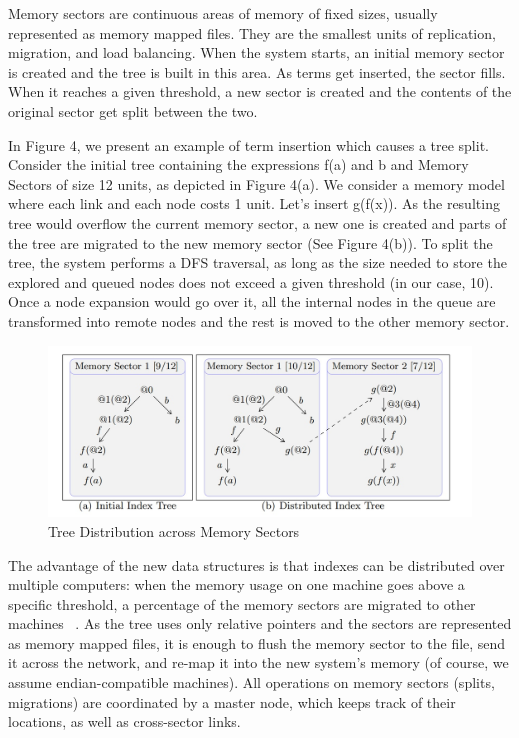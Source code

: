 \documentclass{deliverablereport}
\begin{document}
Memory sectors are continuous areas of memory of fixed sizes, usually represented as memory mapped files. They are the smallest units of replication, migration, and load balancing. When the system starts, an initial memory sector is created and the tree is built in this area. As terms get inserted, the sector fills. When it reaches a given threshold, a new sector is created and the contents of the original sector get split between the two. 

In Figure 4, we present an example of term insertion which causes a tree split. Consider the initial tree containing the expressions f(a) and b and Memory Sectors of size 12 units, as depicted in Figure 4(a). We consider a memory model where each link and each node costs 1 unit. Let’s insert g(f(x)). As the resulting tree would overflow the current memory sector, a new one is created and parts of the tree are migrated to the new memory sector (See Figure 4(b)). To split the tree, the system performs a DFS traversal, as long as the size needed to store the explored and queued nodes does not exceed a given threshold (in our case, 10). Once a node expansion would go over it, all the internal nodes in the queue are transformed into remote nodes and the rest is moved to the other memory sector. 

\begin{figure}[h]
\centering
 \includegraphics[scale=0.6]{figure4.jpg}
 \caption{Tree Distribution across Memory Sectors}
\end{figure}

The advantage of the new data structures is that indexes can be distributed over multiple computers: when the memory usage on one machine goes above a specific threshold, a percentage of the memory sectors are migrated to other machines ~\cite{ProKoh:mwsofse11}. As the tree uses only relative pointers and the sectors are represented as memory mapped files, it is enough to flush the memory sector to the file, send it across the network, and re-map it into the new system’s memory (of course, we assume endian-compatible machines). All operations on memory sectors (splits, migrations) are coordinated by a master node, which keeps track of their locations, as well as cross-sector links. 
\end{document}
